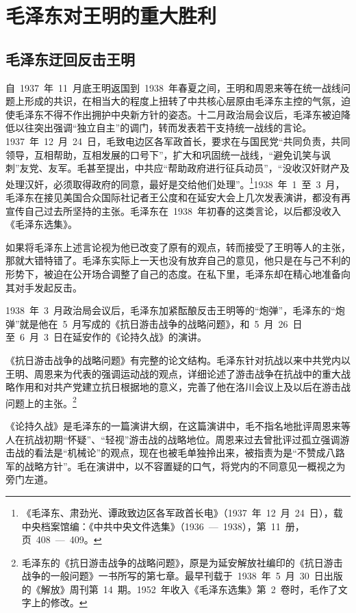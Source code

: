 
\chapter{毛泽东对王明的重大胜利}

\section{毛泽东迂回反击王明}

自~1937~年~11~月底王明返国到~1938~年春夏之间，王明和周恩来等在统一战线问题上形成的共识，在相当大的程度上扭转了中共核心层原由毛泽东主控的气氛，迫使毛泽东不得不作出拥护中央新方针的姿态。十二月政治局会议后，毛泽东被迫降低以往突出强调“独立自主”的调门，转而发表若干支持统一战线的言论。1937~年~12~月~24~日，毛致电边区各军政首长，要求在与国民党“共同负责，共同领导，互相帮助，互相发展的口号下”，扩大和巩固统一战线，“避免讥笑与讽刺”友党、友军。毛甚至提出，中共应“帮助政府进行征兵动员”，“没收汉奸财产及处理汉奸，必须取得政府的同意，最好是交给他们处理”。\footnote{《毛泽东、肃劲光、谭政致边区各军政首长电》（1937~年~12~月~24~日），载中央档案馆编：《中共中央文件选集》（1936~—~1938），第~11~册，页~408~—~409。}1938~年~1~至~3~月，毛泽东在接见美国合众国际社记者王公度和在延安大会上几次发表演讲，都没有再宣传自己过去所坚持的主张。毛泽东在~1938~年初春的这类言论，以后都没收入《毛泽东选集》。

如果将毛泽东上述言论视为他已改变了原有的观点，转而接受了王明等人的主张，那就大错特错了。毛泽东实际上一天也没有放弃自己的意见，他只是在与己不利的形势下，被迫在公开场合调整了自己的态度。在私下里，毛泽东却在精心地准备向其对手发起反击。

1938~年~3~月政治局会议后，毛泽东加紧酝酿反击王明等的“炮弹”，毛泽东的“炮弹”就是他在~5~月写成的《抗日游击战争的战略问题》，和~5~月~26~日至~6~月~3~日在延安作的《论持久战》的演讲。

《抗日游击战争的战略问题》有完整的论文结构。毛泽东针对抗战以来中共党内以王明、周恩来为代表的强调运动战的观点，详细论述了游击战争在抗战中的重大战略作用和对共产党建立抗日根据地的意义，完善了他在洛川会议上及以后在游击战问题上的主张。\footnote{毛泽东的《抗日游击战争的战略问题》，原是为延安解放社编印的《抗日游击战争的一般问题》一书所写的第七章。最早刊载于~1938~年~5~月~30~日出版的《解放》周刊第~14~期。1952~年收入《毛泽东选集》第~2~卷时，毛作了文字上的修改。}

《论持久战》是毛泽东的一篇演讲大纲，在这篇演讲中，毛不指名地批评周恩来等人在抗战初期“怀疑”、“轻视”游击战的战略地位。周恩来过去曾批评过孤立强调游击战的看法是“机械论”的观点，现在也被毛单独拎出来，被指责为是“不赞成八路军的战略方针”。毛在演讲中，以不容置疑的口气，将党内的不同意见一概视之为旁门左道。

